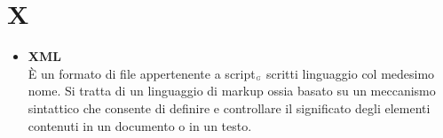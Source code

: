 \chapter{X} \label{X}
\begin{itemize}
  \item \textbf{XML}\\
È un formato di file appertenente a script$_{\scaleto{G}{3pt}}$ scritti linguaggio col medesimo nome.
Si tratta di un linguaggio di markup ossia basato su un meccanismo sintattico che consente di definire e controllare il significato degli elementi contenuti in un documento o in un testo.
\end{itemize}
